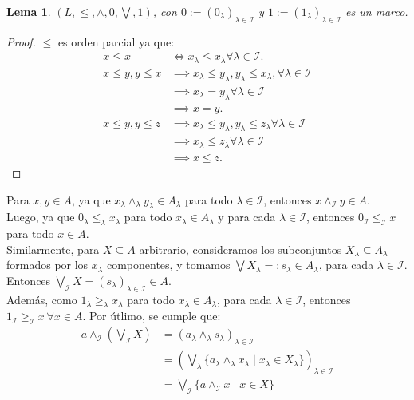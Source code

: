 \documentclass[12pt,letterpaper,titlepage]{article}
\newtheorem{lemma}{Lema}
\theoremstyle{definition}
\newcommand\scr[1]{\mathscr{#1}}
\newcommand\<{\langle}
\renewcommand\>{\rangle}
\begin{document}
\begin{lemma}
    $(L,\leq,\wedge, 0, \bigvee, 1)$, con
    $0:=(0_\lambda)_{\lambda\in\scr{I}}$ y
    $1:=(1_\lambda)_{\lambda\in\scr{I}}$ es un marco.
\end{lemma}
\begin{proof}
    $\leq$ es orden parcial ya que:
    \begin{align*}
        x \leq x
            & \iff x_\lambda \leq x_\lambda \forall \lambda\in\scr I. \\
        x \leq y, y \leq x
            &\implies x_\lambda \leq y_\lambda,
            y_\lambda \leq x_\lambda, \forall  \lambda\in\scr{I}\\
            &\implies x_\lambda = y_\lambda
            \forall\lambda\in\scr{I}\\
            &\implies x = y.\\
        x \leq y, y \leq z
            &\implies x_\lambda \leq y_\lambda,
            y_\lambda \leq z_\lambda
            \forall\lambda\in\scr{I}\\
            &\implies x_\lambda  \leq z_\lambda
            \forall  \lambda\in\scr{I}\\
            &\implies x \leq z.
    \end{align*}
\end{proof}
Para $x,y\in A$, ya que $x_\lambda\wedge_\lambda y_\lambda\in A_\lambda$ para todo $\lambda\in\mathscr{I}$, entonces $x\wedge_\mathscr{I}y\in A$.\\
Luego, ya que $0_\lambda\leq_\lambda x_\lambda$ para todo $x_\lambda\in A_\lambda$ y para cada $\lambda\in\mathscr{I}$, entonces $0_\mathscr{I}\leq_\mathscr{I}x$ para todo $x\in A$.\\
Similarmente, para $X\subseteq A$ arbitrario, consideramos los subconjuntos $X_\lambda\subseteq A_\lambda$ formados por los $x_\lambda$ componentes, y tomamos $\bigvee X_\lambda=:s_\lambda\in A_\lambda$,  para cada $\lambda\in\mathscr{I}$.\\
Entonces $\bigvee_\mathscr{I}X=(s_\lambda)_{\lambda\in\mathscr{I}}\in A$.\\
Además, como $1_\lambda\geq_\lambda x_\lambda$ para todo $x_\lambda\in A_\lambda$, para cada $\lambda\in\mathscr{I}$, entonces $1_\mathscr{I}\geq_\mathscr{I} x\ \forall x\in A$.
Por útlimo, se cumple que:
\begin{align*}
    a\wedge_\mathscr{I}\left(\bigvee_\mathscr{I} X\right) & = (a_\lambda\wedge_\lambda s_\lambda)_{\lambda\in\mathscr{I}}\\
    & = \left(\bigvee_\lambda\{a_\lambda\wedge_\lambda x_\lambda\mid x_\lambda\in X_\lambda\}\right)_{\lambda\in\mathscr{I}}\\
    & = \bigvee_\mathscr{I} \{a\wedge_\mathscr{I}x\mid x\in X\}
\end{align*}
\end{document}
